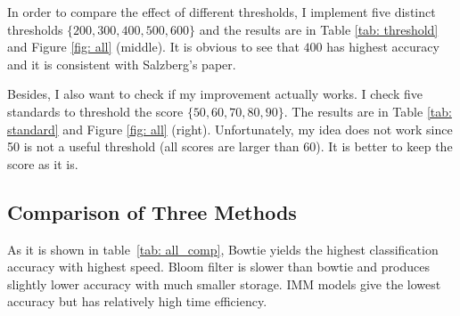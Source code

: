 \documentclass[12pt]{article} %
\begin{document}
In order to compare the effect of different thresholds, I implement five distinct thresholds $\{200, 300, 400, 500, 600\}$ and the results are in Table \ref{tab: threshold} and Figure \ref{fig: all} (middle). It is obvious to see that $400$ has highest accuracy and it is consistent with Salzberg's paper. 

Besides, I also want to check if my improvement actually works. I check five standards to threshold the score $\{50, 60, 70, 80, 90\}$. The results are in Table \ref{tab: standard} and Figure \ref{fig: all} (right). Unfortunately, my idea does not work since 50 is not a useful threshold (all scores are larger than 60). It is better to keep the score as it is. 

\subsection{Comparison of Three Methods}
As it is shown in table~\ref{tab: all_comp}, Bowtie yields the highest classification accuracy with highest speed. Bloom filter is slower than bowtie and produces slightly lower accuracy with much smaller storage. IMM models give the lowest accuracy but has relatively high time efficiency. 
\end{document}
